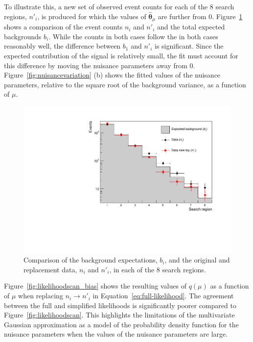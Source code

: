 To illustrate this, a new set of observed event counts for each of the 8 search regions, $n'_{i}$, is produced for which the values of 
$\hat{\boldsymbol{\theta}}_{\mu}$ are further from 0. Figure~\ref{fig:comparedata} shows a comparison of the event counts $n_{i}$ and 
$n'_{i}$ and the total expected backgrounds $b_{i}$. While the counts in both cases 
follow the in both cases reasonably well, the difference between $b_{1}$ and $n'_{i}$ is significant. Since the expected contribution of the signal 
is relatively small, the fit must account for this difference by moving the nuisance parameters away from 0. Figure~\ref{fig:nuisancevariation} (b) shows the fitted
values of the nuisance parameters, relative to the square root of the background variance, as a function of $\mu$.

\begin{figure}[hbt]
  \begin{center} 
   \includegraphics[width=1.5\cmsFigWidth]{figures/newdata.pdf}
   \caption{Comparison of the background expectations, $b_{i}$, and the original and replacement data, $n_{i}$ and $n'_{i}$,  in each of the 8 search regions.}
   \label{fig:comparedata} 
  \end{center}
\end{figure}


Figure~\ref{fig:likelihoodscan_bias} shows the resulting 
values of $q(\mu)$ as a function of $\mu$ when replacing $n_{i}\rightarrow n'_{i}$ in Equation~\ref{eq:full-likelihood}. The agreement between the 
full and simplified likelihoods is significantly poorer compared to Figure~\ref{fig:likelihoodscan}. This highlights the limitations of 
the multivariate Gaussian approximation as a model of the probability density function for 
the nuisance parameters when the values of the nuisance parameters are large. 

